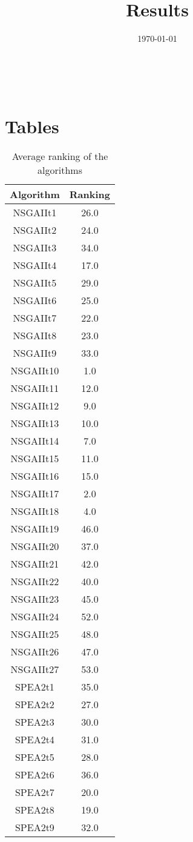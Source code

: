 \documentclass{article}
\title{Results}
\author{}
\date{\today}
\begin{document}
\oddsidemargin 0in \topmargin 0in\maketitle
\
\section{Tables}
\begin{table}[!htp]
\centering
\caption{Average ranking of the algorithms}
\begin{tabular}{c|c}
Algorithm&Ranking\\
\hline
NSGAIIt1&26.0\\
NSGAIIt2&24.0\\
NSGAIIt3&34.0\\
NSGAIIt4&17.0\\
NSGAIIt5&29.0\\
NSGAIIt6&25.0\\
NSGAIIt7&22.0\\
NSGAIIt8&23.0\\
NSGAIIt9&33.0\\
NSGAIIt10&1.0\\
NSGAIIt11&12.0\\
NSGAIIt12&9.0\\
NSGAIIt13&10.0\\
NSGAIIt14&7.0\\
NSGAIIt15&11.0\\
NSGAIIt16&15.0\\
NSGAIIt17&2.0\\
NSGAIIt18&4.0\\
NSGAIIt19&46.0\\
NSGAIIt20&37.0\\
NSGAIIt21&42.0\\
NSGAIIt22&40.0\\
NSGAIIt23&45.0\\
NSGAIIt24&52.0\\
NSGAIIt25&48.0\\
NSGAIIt26&47.0\\
NSGAIIt27&53.0\\
SPEA2t1&35.0\\
SPEA2t2&27.0\\
SPEA2t3&30.0\\
SPEA2t4&31.0\\
SPEA2t5&28.0\\
SPEA2t6&36.0\\
SPEA2t7&20.0\\
SPEA2t8&19.0\\
SPEA2t9&32.0\\

\end{tabular}
\end{table}
\end{document}
